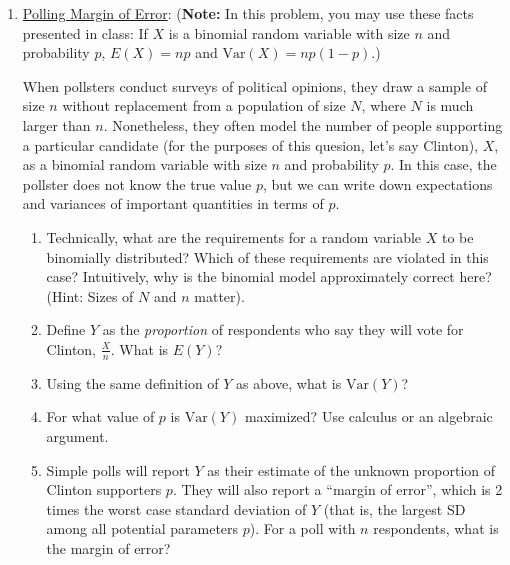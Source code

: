 \documentclass[11pt]{article}
\newcommand{\V}{\mathrm{Var}}
\begin{document}
\begin{enumerate}
\item \underline{Polling Margin of Error}:
    ({\bf Note:} In this problem, you may use these facts presented in class: If $X$ is a binomial random variable with size $n$ and probability $p$, $E(X) = np$ and $\V(X) = np(1-p)$.)

    When pollsters conduct surveys of political opinions, they draw a sample of size $n$ without replacement from a population of size $N$, where $N$ is much larger than $n$. Nonetheless, they often model the number of people supporting a particular candidate (for the purposes of this quesion, let's say Clinton), $X$, as a binomial random variable with size $n$ and probability $p$. In this case, the pollster does not know the true value $p$, but we can write down expectations and variances of important quantities in terms of $p$.

    \begin{enumerate}
        \item Technically, what are the requirements for a random variable $X$ to be binomially distributed? Which of these requirements are violated in this case? Intuitively, why is the binomial model approximately correct here? (Hint: Sizes of $N$ and $n$ matter).
        \item Define $Y$ as the \emph{proportion} of respondents who say they will vote for Clinton, $\frac{X}{n}$. What is $E(Y)$?
        \item Using the same definition of $Y$ as above, what is $\V(Y)$?
        \item For what value of $p$ is $\V(Y)$ maximized? Use calculus or an algebraic argument.
        \item Simple polls will report $Y$ as their estimate of the unknown proportion of Clinton supporters $p$. They will also report a ``margin of error'', which is 2 times the worst case standard deviation of $Y$ (that is, the largest SD among all potential parameters $p$). For a poll with $n$ respondents, what is the margin of error?
    \end{enumerate}

\end{enumerate}
\end{document}
